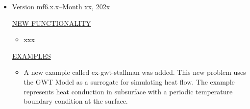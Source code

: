 \documentclass[11pt,twoside,twocolumn]{usgsreport}
\begin{document}
\begin{itemize}
	
	\item Version mf6.x.x--Month xx, 202x
	
	\underline{NEW FUNCTIONALITY}
	\begin{itemize}
		\item xxx
	\end{itemize}

	\underline{EXAMPLES}
	\begin{itemize}
		\item A new example called ex-gwt-stallman was added.  This new problem uses the GWT Model as a surrogate for simulating heat flow.  The example represents heat conduction in subsurface with a periodic temperature boundary condition at the surface.
	\end{itemize}


\end{itemize}
\end{document}
